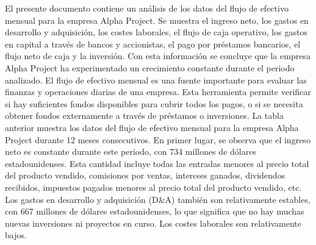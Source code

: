  El presente documento contiene un análisis de los datos del flujo de efectivo mensual para la empresa Alpha Project. Se muestra el ingreso neto, los gastos en desarrollo y adquisición, los costes laborales, el flujo de caja operativo, los gastos en capital a través de bancos y accionistas, el pago por préstamos bancarios, el flujo neto de caja y la inversión. Con esta información se concluye que la empresa Alpha Project ha experimentado un crecimiento constante durante el periodo analizado.
El flujo de efectivo mensual es una fuente importante para evaluar las finanzas y operaciones diarias de una empresa. Esta herramienta permite verificar si hay suficientes fondos disponibles para cubrir todos los pagos, o si se necesita obtener fondos externamente a través de préstamos o inversiones. La tabla anterior muestra los datos del flujo de efectivo mensual para la empresa Alpha Project durante 12 meses consecutivos.
En primer lugar, se observa que el ingreso neto es constante durante este periodo, con 734 millones de dólares estadounidenses. Esta cantidad incluye todas las entradas menores al precio total del producto vendido, comisiones por ventas, intereses ganados, dividendos recibidos, impuestos pagados menores al precio total del producto vendido, etc. Los gastos en desarrollo y adquisición (D&A) también son relativamente estables, con 667 millones de dólares estadounidenses, lo que significa que no hay muchas nuevas inversiones ni proyectos en curso. Los costes laborales son relativamente bajos.

